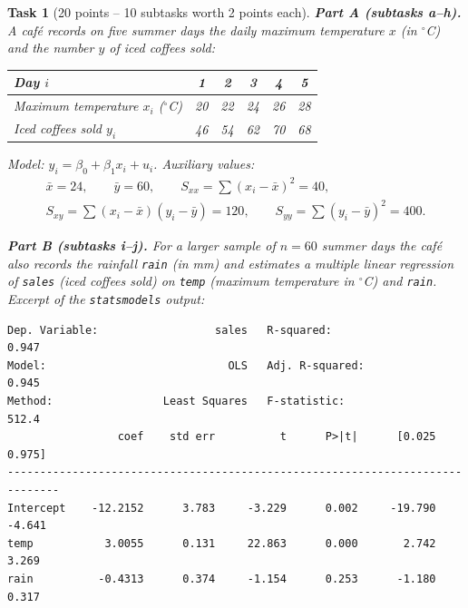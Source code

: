 \documentclass[a4paper]{article}
\theoremstyle{break}
\newtheorem{task}{Task}
\begin{document}
\begin{task} [20 points -- 10 subtasks worth 2 points each]
\textbf{Part A (subtasks a--h).} A caf\'e records on five summer days the daily
maximum temperature $x$ (in $^{\circ}$C) and the number $y$ of iced coffees sold:

\medskip
\begin{center}
\begin{tabular}{lccccc}
\toprule
Day $i$ & 1 & 2 & 3 & 4 & 5\\
\midrule
Maximum temperature $x_i$ ($^{\circ}$C) & 20 & 22 & 24 & 26 & 28\\
Iced coffees sold $y_i$ & 46 & 54 & 62 & 70 & 68\\
\bottomrule
\end{tabular}
\end{center}

\medskip
\noindent Model: $y_i = \beta_0 + \beta_1 x_i + u_i$. Auxiliary values:
\begin{gather*}
\bar x = 24, \qquad \bar y = 60, \qquad S_{xx} = \sum (x_i-\bar x)^2 = 40,\\
S_{xy} = \sum (x_i-\bar x)(y_i-\bar y) = 120, \qquad S_{yy} = \sum (y_i-\bar y)^2 = 400.
\end{gather*}

\medskip
\noindent\textbf{Part B (subtasks i--j).} For a larger sample of $n = 60$ summer days the
caf\'e also records the rainfall \texttt{rain} (in mm) and estimates a multiple linear
regression of \texttt{sales} (iced coffees sold) on \texttt{temp} (maximum temperature in
$^{\circ}$C) and \texttt{rain}. Excerpt of the \texttt{statsmodels} output:
\begin{footnotesize}
\begin{verbatim}
Dep. Variable:                  sales   R-squared:                       0.947
Model:                            OLS   Adj. R-squared:                  0.945
Method:                 Least Squares   F-statistic:                     512.4
                 coef    std err          t      P>|t|      [0.025      0.975]
------------------------------------------------------------------------------
Intercept    -12.2152      3.783     -3.229      0.002     -19.790      -4.641
temp           3.0055      0.131     22.863      0.000       2.742       3.269
rain          -0.4313      0.374     -1.154      0.253      -1.180       0.317
\end{verbatim}
\end{footnotesize}


\end{task}
\end{document}
